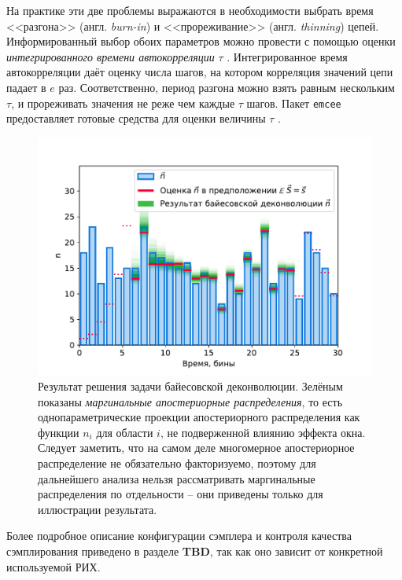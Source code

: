 \documentclass[12pt]{book}
\begin{document}
	На практике эти две проблемы выражаются в необходимости выбрать время <<разгона>> (англ. \textit{burn-in}) и <<прореживание>> (англ. \textit{thinning}) цепей. Информированный выбор обоих параметров можно провести с помощью оценки \textit{интегрированного времени автокорреляции} $\tau$ \cite{Sokal1997}. Интегрированное время автокорреляции даёт оценку числа шагов, на котором корреляция значений цепи падает в $e$ раз. Соответственно, период разгона можно взять равным нескольким $\tau$, и прореживать значения не реже чем каждые $\tau$ шагов. Пакет \verb|emcee| предоставляет готовые средства для оценки величины $\tau$ .
	
	\begin{figure}
		\centering
		\includegraphics[width=\columnwidth]{bayesian-estimation-result}
		\caption{Результат решения задачи байесовской деконволюции. Зелёным показаны \textit{маргинальные апостериорные распределения}, то есть однопараметрические проекции апостериорного распределения как функции $n_i$ для области $i$, не подверженной влиянию эффекта окна. Следует заметить, что на самом деле многомерное апостериорное распределение не обязательно факторизуемо, поэтому для дальнейшего анализа нельзя рассматривать маргинальные распределения по отдельности -- они приведены только для иллюстрации результата.}
		\label{pic:bayesian-estimation}
	\end{figure}

	Более подробное описание конфигурации сэмплера и контроля качества сэмплирования приведено в разделе \textbf{TBD}, так как оно зависит от конкретной используемой РИХ.
\end{document}
